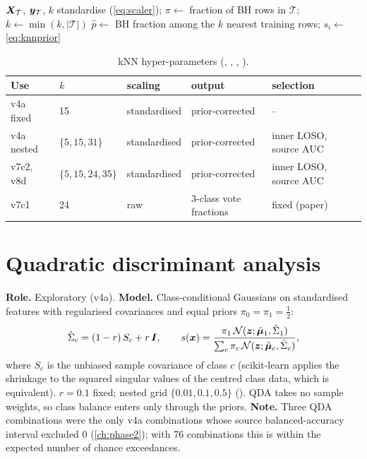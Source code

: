 \begin{algorithm}[htbp]
\caption{kNN classifier (binary, prior-corrected)}\label{alg:knn}
\begin{algorithmic}[1]
\Require $\bm{X}_\mathcal T$, $\bm{y}_\mathcal T$, $k$
\State standardise (\cref{eq:scaler}); $\pi\gets$ fraction of BH rows in $\mathcal T$; $k\gets\min(k,|\mathcal T|)$
 \State $\hat p\gets$ BH fraction among the $k$ nearest training rows; $s_i\gets$ \cref{eq:knnprior} \EndFor
\end{algorithmic}
\end{algorithm}

\begin{table}[htbp]
\centering\small
\caption[kNN hyper-parameters]{kNN hyper-parameters (, , , ).}\label{tab:hp-knn}
\begin{tabular}{@{}lllll@{}}
\toprule
Use & $k$ & scaling & output & selection \\
\midrule
v4a fixed & 15 & standardised & prior-corrected & -- \\
v4a nested & $\{5,15,31\}$ & standardised & prior-corrected & inner LOSO, source AUC \\
v7c2, v8d & $\{5,15,24,35\}$ & standardised & prior-corrected & inner LOSO, source AUC \\
v7c1 & 24 & raw & 3-class vote fractions & fixed (paper) \\
\bottomrule
\end{tabular}
\end{table}

\section{Quadratic discriminant analysis}\label{sec:qda}
\textbf{Role.} Exploratory (v4a). \textbf{Model.} Class-conditional Gaussians on standardised features with regularised
covariances and equal priors $\pi_0=\pi_1=\tfrac12$:
\begin{equation}
\hat\Sigma_c = (1-r)\,S_c + r\,\bm{I},\qquad
s(\bm{x}) = \frac{\pi_1\,\mathcal N(\bm{z};\hat{\bm{\mu}}_1,\hat\Sigma_1)}{\sum_{c}\pi_c\,\mathcal N(\bm{z};\hat{\bm{\mu}}_c,\hat\Sigma_c)},\label{eq:qda}
\end{equation}
where $S_c$ is the unbiased sample covariance of class $c$ (scikit-learn applies the shrinkage to the squared singular
values of the centred class data, which is equivalent). $r=0.1$ fixed; nested grid $\{0.01,0.1,0.5\}$ ().
QDA takes no sample weights, so class balance enters only through the priors. \textbf{Note.} Three QDA combinations were
the only v4a combinations whose source balanced-accuracy interval excluded 0 (\cref{ch:phase2}); with 76 combinations
this is within the expected number of chance exceedances.

